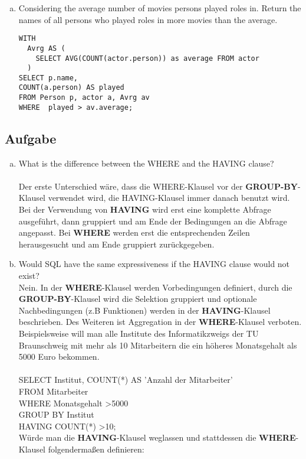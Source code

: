 \documentclass[11pt,a4paper,DIV=9]{scrartcl}
\newcounter{temp}
\newcommand{\aufgabe}[1]{
  \setcounter{temp}{\value{subsection}}
  \setcounter{subsection}{#1}
  \addtocounter{subsection}{-1}
  \subsection{Aufgabe}
  \setcounter{subsection}{\value{temp}}
}
\begin{document}
\begin{enumerate}[a.]
      \item Considering the average number of movies persons played roles in. Return the names of all persons who played roles in more movies than the average.\hfill\\
\begin{lstlisting}
WITH 
  Avrg AS (
    SELECT AVG(COUNT(actor.person)) as average FROM actor
  ) 
SELECT p.name, 
COUNT(a.person) AS played 
FROM Person p, actor a, Avrg av 
WHERE  played > av.average; 
\end{lstlisting}

      
    \end{enumerate}
\aufgabe{2}
\begin{enumerate}[a.]
\item What is the difference between the WHERE and the HAVING clause? \hfill\\\\
 Der erste Unterschied w\"are, dass die WHERE-Klausel vor der \textbf{GROUP-BY}-Klausel verwendet wird, die HAVING-Klausel immer danach benutzt wird. Bei der Verwendung von \textbf{HAVING} wird erst eine komplette Abfrage ausgef\"uhrt, dann gruppiert und am Ende der Bedingungen an die Abfrage angepasst. Bei \textbf{WHERE} werden erst die entsprechenden Zeilen herausgesucht und am Ende gruppiert zur\"uckgegeben. \\
\item Would SQL have the same expressiveness if the HAVING clause would not exist? \hfill\\
Nein. In der \textbf{WHERE}-Klausel werden Vorbedingungen definiert, durch die \textbf{GROUP-BY}-Klausel wird die Selektion gruppiert und optionale Nachbedingungen (z.B Funktionen) werden in der \textbf{HAVING}-Klausel beschrieben. Des Weiteren ist Aggregation in der \textbf{WHERE}-Klausel verboten. Beispielsweise will man alle Institute des Informatikzweigs der TU Braunschweig mit mehr als 10 Mitarbeitern die ein h\"oheres Monatsgehalt als 5000 Euro bekommen. \\\\
SELECT Institut, COUNT(*) AS 'Anzahl der Mitarbeiter' \\
FROM Mitarbeiter \\
WHERE Monatsgehalt \textgreater 5000 \\
GROUP BY Institut \\
HAVING COUNT(*) \textgreater 10; \\
W\"urde man die \textbf{HAVING}-Klausel weglassen und stattdessen die \textbf{WHERE}-Klausel folgenderma{\ss}en definieren: \\\\

\end{enumerate}
\end{document}
